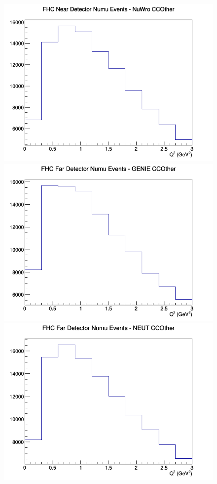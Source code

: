 \begin{figure}[h]
\includegraphics[width=\linewidth]{Q2/nominal/CCOther_FHC_ND_numu_Q2_NuWro.png}
\endminipage
\newline
{}
\includegraphics[width=\linewidth]{Q2/nominal/CCOther_FHC_FD_numu_Q2_GENIE.png}
\endminipage
{}
\includegraphics[width=\linewidth]{Q2/nominal/CCOther_FHC_FD_numu_Q2_NEUT.png}

\end{figure}
